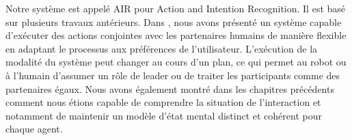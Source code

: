 \documentclass[a4paper,11pt,twoside]{StyleThese}
\begin{document}
Notre système est appelé AIR pour Action and Intention Recognition. Il est basé sur plusieurs travaux antérieurs. Dans \cite{fioreiser2014}, nous avons présenté un système capable d'exécuter des actions conjointes avec les partenaires humains de manière flexible en adaptant le processus aux préférences de l'utilisateur. L'exécution de la modalité du système peut changer au cours d'un plan, ce qui permet au robot ou à l'humain d'assumer un rôle de leader ou de traiter les participants comme des partenaires égaux. Nous avons également montré dans les chapitres précédents comment nous étions capable de comprendre la situation de l'interaction et notamment de maintenir un modèle d'état mental distinct et cohérent pour chaque agent.



\end{document}
